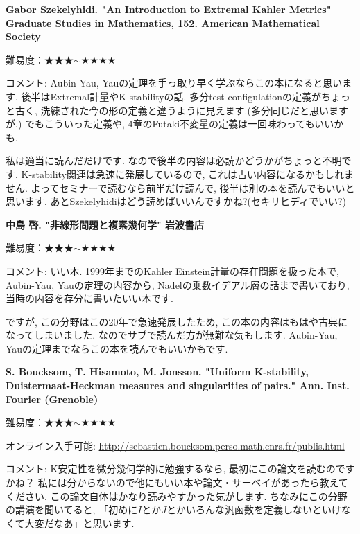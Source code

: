 \textbf{Gabor Szekelyhidi. "An Introduction to Extremal Kahler Metrics" Graduate Studies in Mathematics, 152. American Mathematical Society}  \vspace{-6pt} 

難易度：★★★$\sim$★★★★ \vspace{-6pt} 

コメント: Aubin-Yau, Yauの定理を手っ取り早く学ぶならこの本になると思います. 後半はExtremal計量やK-stabilityの話. 多分test configulationの定義がちょっと古く, 洗練された今の形の定義と違うように見えます.(多分同じだと思いますが.) でもこういった定義や, 4章のFutaki不変量の定義は一回味わってもいいかも. 

私は適当に読んだだけです. なので後半の内容は必読かどうかがちょっと不明です. K-stability関連は急速に発展しているので, これは古い内容になるかもしれません. 
よってセミナーで読むなら前半だけ読んで, 後半は別の本を読んでもいいと思います. 
あとSzekelyhidiはどう読めばいいんですかね?(セキリヒディでいい?)
\vspace{8pt}

\textbf{中島 啓. "非線形問題と複素幾何学" 岩波書店}  \vspace{-6pt} 

難易度：★★★$\sim$★★★★ \vspace{-6pt} 

コメント: いい本. 1999年までのKahler Einstein計量の存在問題を扱った本で, Aubin-Yau, Yauの定理の内容から, Nadelの乗数イデアル層の話まで書いており, 当時の内容を存分に書いたいい本です.

ですが, この分野はこの20年で急速発展したため, この本の内容はもはや古典になってしまいました. 
なのでサブで読んだ方が無難な気もします. Aubin-Yau, Yauの定理までならこの本を読んでもいいかもです.
\vspace{8pt}

\textbf{S. Boucksom, T. Hisamoto, M. Jonsson. "Uniform K-stability, Duistermaat-Heckman measures and singularities of pairs." Ann. Inst. Fourier (Grenoble)}  \vspace{-6pt} 

難易度：★★★$\sim$★★★★ \vspace{-6pt} 

オンライン入手可能: \url{http://sebastien.boucksom.perso.math.cnrs.fr/publis.html}

コメント: K安定性を微分幾何学的に勉強するなら, 最初にこの論文を読むのですかね？ 私には分からないので他にもいい本や論文・サーベイがあったら教えてください. 
この論文自体はかなり読みやすかった気がします. 
ちなみにこの分野の講演を聞いてると, 「初めに$I$とか$J$とかいろんな汎函数を定義しないといけなくて大変だなあ」と思います. 


